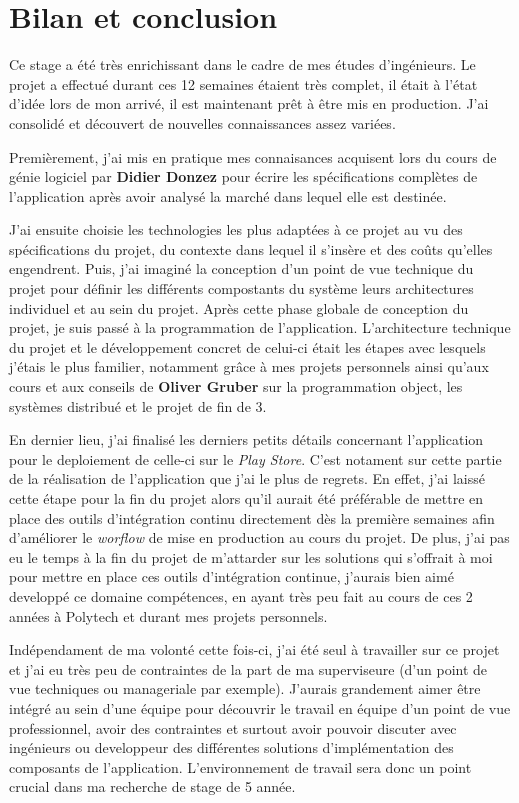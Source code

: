 \chapter{Bilan et conclusion}
\label{chapter:bilan}

Ce stage a été très enrichissant dans le cadre de mes études d'ingénieurs. Le projet a effectué durant ces 12 semaines étaient très complet, il était à l'état d'idée lors de mon arrivé, il est maintenant prêt à être mis en production. J'ai consolidé et découvert de nouvelles connaissances assez variées.

Premièrement, j'ai mis en pratique mes connaisances acquisent lors du cours de génie logiciel par \textbf{Didier Donzez} pour écrire les spécifications complètes de l'application après avoir analysé la marché dans lequel elle est destinée.

J'ai ensuite choisie les technologies les plus adaptées à ce projet au vu des spécifications du projet, du contexte dans lequel il s'insère et des coûts qu'elles engendrent. Puis, j'ai imaginé la conception d'un point de vue technique du projet pour définir les différents compostants du système leurs architectures individuel et au sein du projet. Après cette phase globale de conception du projet, je suis passé à la programmation de l'application. L'architecture technique du projet et le développement concret de celui-ci était les étapes avec lesquels j'étais le plus familier, notamment grâce à mes projets personnels ainsi qu'aux cours et aux conseils de \textbf{Oliver Gruber} sur la programmation object, les systèmes distribué et le projet de fin de 3.

En dernier lieu, j'ai finalisé les derniers petits détails concernant l'application pour le deploiement de celle-ci sur le \textit{Play Store}. C'est notament sur cette partie de la réalisation de l'application que j'ai le plus de regrets. En effet, j'ai laissé cette étape pour la fin du projet alors qu'il aurait été préférable de mettre en place des outils d'intégration continu directement dès la première semaines afin d'améliorer le \textit{worflow} de mise en production au cours du projet. De plus, j'ai pas eu le temps à la fin du projet de m'attarder sur les solutions qui s'offrait à moi pour mettre en place ces outils d'intégration continue, j'aurais bien aimé developpé ce domaine compétences, en ayant très peu fait au cours de ces 2 années à Polytech et durant mes projets personnels.

Indépendament de ma volonté cette fois-ci, j'ai été seul à travailler sur ce projet et j'ai eu très peu de contraintes de la part de ma superviseure (d'un point de vue techniques ou manageriale par exemple). J'aurais grandement aimer être intégré au sein d'une équipe pour découvrir le travail en équipe d'un point de vue professionnel, avoir des contraintes et surtout avoir pouvoir discuter avec ingénieurs ou developpeur des différentes solutions d'implémentation des composants de l'application. L'environnement de travail sera donc un point crucial dans ma recherche de stage de 5 année.
